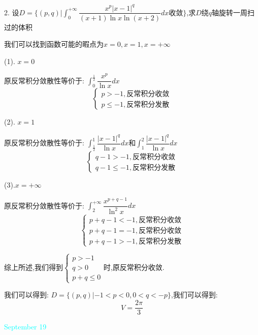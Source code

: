2. 设$D=\{(p,q)|\int_{0}^{+\infty}\dfrac{x^p|x-1|^q}{(x+1)\ln x\ln(x+2)}dx\text{收敛}\}$,求$D$绕$q$轴旋转一周扫过的体积
\begin{solution}

	我们可以找到函数可能的暇点为$x=0,x=1,x=+\infty$
	
	(1). $x=0$
	
	原反常积分敛散性等价于:  $\int_{0}^{\frac{1}{2}}\dfrac{x^p}{\ln x}dx$
	$$\left\lbrace
	\begin{array}{l}
		p>-1,\text{反常积分收敛}\\
		p\leq-1,\text{反常积分发散}
	\end{array}
	\right. $$
	
	(2). $x=1$
	
	原反常积分敛散性等价于:  $\int_{\frac{1}{2}}^{1}\dfrac{|x-1|^q}{\ln x}dx$和$\int_{1}^{2}\dfrac{|x-1|^q}{\ln x}dx$
	$$\left\lbrace
	\begin{array}{l}
		q-1>-1,\text{反常积分收敛}\\
		q-1\leq-1,\text{反常积分发散}
	\end{array}
	\right. $$
	
	(3).$x=+\infty$
	
	原反常积分敛散性等价于:  $\int_{2}^{+\infty}\dfrac{x^{p+q-1}}{\ln^2 x}dx$
	$$\left\lbrace
	\begin{array}{l}
		p+q-1<-1,\text{反常积分收敛}\\
		p+q-1=-1,\text{反常积分收敛}\\
		p+q-1>-1,\text{反常积分发散}
	\end{array}
	\right. $$
	
	综上所述,我们得到$\left\lbrace
	\begin{array}{l}
		p>-1\\
		q>0\\
		p+q\leq 0
	\end{array}
	\right. $时,原反常积分收敛.
	
	我们可以得到:  $D=\{(p,q)|-1<p<0,0<q<-p\}$,我们可以得到:  
	$$V=\dfrac{2\pi}{3}$$
\end{solution}

\textcolor{cyan}{September 19}

